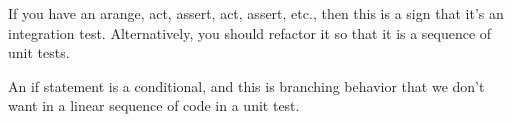   If you have an arange, act, assert, act, assert, etc., then this is a sign that it's an integration test. Alternatively, you should refactor it so that it is a sequence of unit tests. 

  \begin{theorem}
    An if statement is a conditional, and this is branching behavior that we don't want in a linear sequence of code in a unit test. 
  \end{theorem}

